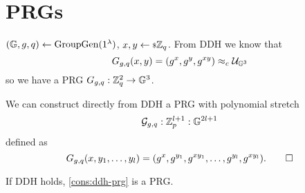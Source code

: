 \section{\aclp{PRG}}

$(\mathbb{G} , \allowbreak g , \allowbreak q) \leftarrow \mathrm{GroupGen}(1^{\lambda})$, $x,y \leftarrow {\scriptstyle \$} {\mathbb{Z}_q}$.
From \ac{DDH} we know that
\begin{equation*}
	G_{g,q}(x,y) = (g^x, g^y, g^{xy}) \approx_c \mathcal{U}_{\mathbb{G}^3}
\end{equation*}
so we have a \ac{PRG} $G_{g,q} : \mathbb{Z}_q^2 \to \mathbb{G}^3$.

\begin{construction} \label{cons:ddh-prg}
	We can construct directly from \ac{DDH} a \ac{PRG} with polynomial stretch
	\begin{equation*}
		\mathcal{G}_{g,q} : \mathbb{Z}_p^{l+1} : \mathbb{G}^{2l+1}
	\end{equation*}
	defined as
	\begin{equation*}
		G_{g,q}(x, y_1, \dots, y_l) = 
		(g^{x}, g^{y_1}, g^{x y_1}, \dots, g^{y_l}, g^{x y_l}). \qedhere
	\end{equation*}
\end{construction}

\begin{theorem} \label{thm:ddh-prg}
	If \ac{DDH} holds, \cref{cons:ddh-prg} is a \ac{PRG}.
\end{theorem}

